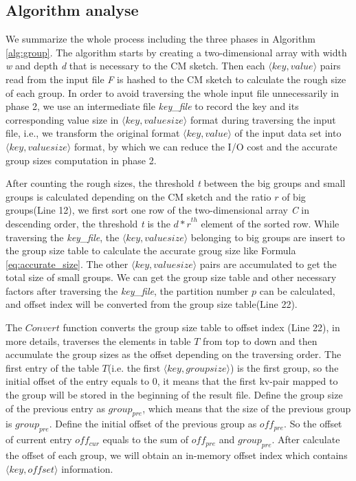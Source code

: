 \subsection{Algorithm analyse}
We summarize the whole process including the three phases in Algorithm \ref{alg:group}. The algorithm starts by creating a two-dimensional array with width \emph{w} and depth \emph{d} that is necessary to the CM sketch. Then each $\langle key, value\rangle$ pairs read from the input file \emph{F} is hashed to the CM sketch to calculate the rough size of each group. In order to avoid traversing the whole input file unnecessarily in phase 2, we use an intermediate file \emph{key\_file} to record the key and its corresponding value size in $\langle key, valuesize\rangle$ format during traversing the input file, i.e., we transform the original format $\langle key, value\rangle$ of the input data set into $\langle key, valuesize\rangle$ format, by which we can reduce the I/O cost and the accurate group sizes computation in phase 2.

After counting the rough sizes, the threshold \emph{t} between the big groups and small groups is calculated depending on the CM sketch and the ratio $r$ of big groups(Line 12), we first sort one row of the two-dimensional array \emph{C} in descending order, the threshold \emph{t} is the ${d*r}^{th}$ element of the sorted row. While traversing the \emph{key\_file}, the $\langle key, valuesize\rangle$ belonging to big groups are insert to the group size table to calculate the accurate groug size like Formula \ref{eq:accurate_size}. The other $\langle key, valuesize\rangle$ pairs are accumulated to get the total size of small groups. We can get the group size table and other necessary factors after traversing the \emph{key\_file}, the partition number $p$ can be calculated, and offset index will be converted from the group size table(Line 22).

The $Convert$ function converts the group size table to offset index (Line 22), in more details, traverses the elements in table $T$ from top to down and then accumulate the group sizes as the offset depending on the traversing order. The first entry of the table $T$(i.e. the first $\langle key, groupsize\rangle$) is the first group, so the initial offset of the entry equals to 0, it means that the first kv-pair mapped to the group will be stored in the beginning of the result file. Define the group size of the previous entry as $group_{pre}$, which means that the size of the previous group is $group_{pre}$. Define the initial offset of the previous group as ${off}_{pre}$. So the offset of current entry ${off}_{cur}$ equals to the sum of ${off}_{pre}$ and $group_{pre}$. After calculate the offset of each group, we will obtain an in-memory offset index which contains $\langle key,offset\rangle$ information. 

